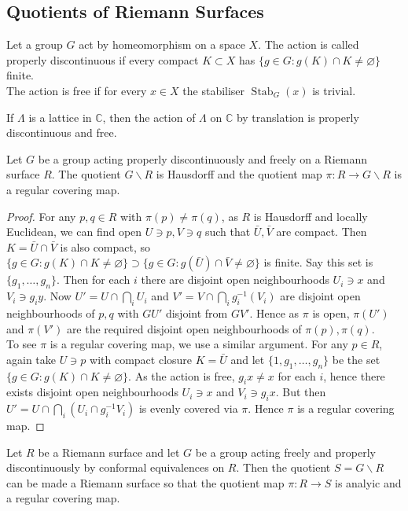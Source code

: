 \subsection{Quotients of Riemann Surfaces}
\begin{definition}
    Let a group $G$ act by homeomorphism on a space $X$.
    The action is called properly discontinuous if every compact $K\subset X$ has $\{g\in G:g(K)\cap K\neq\varnothing\}$ finite.\\
    The action is free if for every $x\in X$ the stabiliser $\operatorname{Stab}_G(x)$ is trivial.
\end{definition}
\begin{example}
    If $\Lambda$ is a lattice in $\mathbb C$, then the action of $\Lambda$ on $\mathbb C$ by translation is properly discontinuous and free.
\end{example}
\begin{lemma}
    Let $G$ be a group acting properly discontinuously and freely on a Riemann surface $R$.
    The quotient $G\backslash R$ is Hausdorff and the quotient map $\pi:R\to G\backslash R$ is a regular covering map.
\end{lemma}
\begin{proof}
    For any $p,q\in R$ with $\pi(p)\neq\pi(q)$, as $R$ is Hausdorff and locally Euclidean, we can find open $U\ni p,V\ni q$ such that $\bar{U},\bar{V}$ are compact.
    Then $K=\bar{U}\cap\bar{V}$ is also compact, so $\{g\in G:g(K)\cap K\neq\varnothing\}\supset\{g\in G:g(\bar{U})\cap\bar{V}\neq\varnothing\}$ is finite.
    Say this set is $\{g_1,\ldots,g_n\}$.
    Then for each $i$ there are disjoint open neighbourhoods $U_i\ni x$ and $V_i\ni g_iy$.
    Now $U'=U\cap\bigcap_iU_i$ and $V'=V\cap\bigcap_ig_i^{-1}(V_i)$ are disjoint open neighbourhoods of $p,q$ with $GU'$ disjoint from $GV'$.
    Hence as $\pi$ is open, $\pi(U')$ and $\pi(V')$ are the required disjoint open neighbourhoods of $\pi(p),\pi(q)$.\\
    To see $\pi$ is a regular covering map, we use a similar argument.
    For any $p\in R$, again take $U\ni p$ with compact closure $K=\bar{U}$ and let $\{1,g_1,\ldots,g_n\}$ be the set $\{g\in G:g(K)\cap K\neq\varnothing\}$.
    As the action is free, $g_ix\neq x$ for each $i$, hence there exists disjoint open neighbourhoods $U_i\ni x$ and $V_i\ni g_ix$.
    But then $U'=U\cap\bigcap_i(U_i\cap g_i^{-1}V_i)$ is evenly covered via $\pi$.
    Hence $\pi$ is a regular covering map.
\end{proof}
\begin{proposition}
    Let $R$ be a Riemann surface and let $G$ be a group acting freely and properly discontinuously by conformal equivalences on $R$.
    Then the quotient $S=G\backslash R$ can be made a Riemann surface so that the quotient map $\pi:R\to S$ is analyic and a regular covering map.
\end{proposition}

